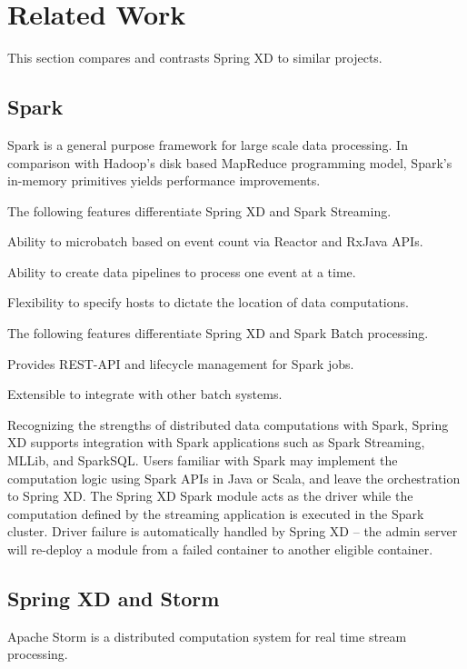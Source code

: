 \section{Related Work}
This section compares and contrasts Spring XD to similar projects.

\subsection{Spark}
Spark\cite{spark} is a general purpose framework for large scale data processing.
In comparison with Hadoop's disk based MapReduce programming model, Spark's
in-memory primitives yields performance improvements.

The following features differentiate Spring XD and Spark Streaming.

\begin{itemize*}
\item Ability to microbatch based on event count via Reactor and RxJava APIs.
\item Ability to create data pipelines to process one event at a time.
\item Flexibility to specify hosts to dictate the location of data computations.
\end{itemize*}

The following features differentiate Spring XD and Spark Batch processing.

\begin{itemize*}
\item Provides REST-API and lifecycle management for Spark jobs.
\item Extensible to integrate with other batch systems.
\end{itemize*}

Recognizing the strengths of distributed data computations with Spark, Spring XD
supports integration with Spark applications such as Spark Streaming, MLLib, and
SparkSQL. Users familiar with Spark may implement the computation logic using
Spark APIs in Java or Scala, and leave the orchestration to Spring XD.
The Spring XD Spark module acts as the driver while the computation defined
by the streaming application is executed in the Spark cluster. Driver failure
is automatically handled by Spring XD -- the admin server will re-deploy a
module from a failed container to another eligible container.

\subsection{Spring XD and Storm}
Apache Storm\cite{storm} is a distributed computation system for real time stream
processing.

